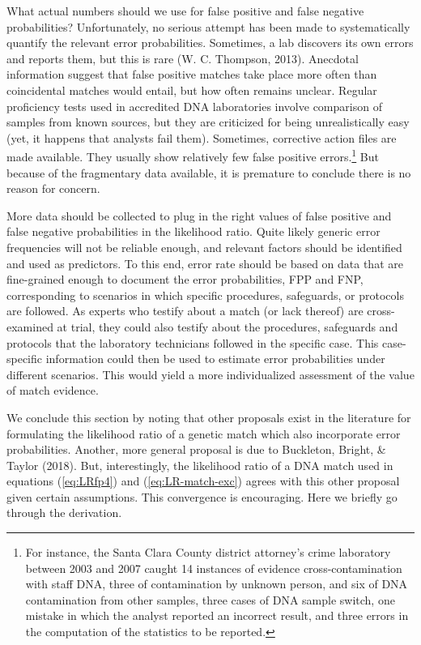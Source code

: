 \documentclass[
  letterpaper,
  DIV=11,
  numbers=noendperiod]{scrartcl}
\begin{document}
What actual numbers should we use for false positive and false negative
probabilities? Unfortunately, no serious attempt has been made to
systematically quantify the relevant error probabilities. Sometimes, a
lab discovers its own errors and reports them, but this is rare (W. C.
Thompson, 2013). Anecdotal information suggest that false positive
matches take place more often than coincidental matches would entail,
but how often remains unclear. Regular proficiency tests used in
accredited DNA laboratories involve comparison of samples from known
sources, but they are criticized for being unrealistically easy (yet, it
happens that analysts fail them). Sometimes, corrective action files are
made available. They usually show relatively few false positive
errors.\footnote{For instance, the Santa Clara County district
  attorney's crime laboratory between 2003 and 2007 caught 14 instances
  of evidence cross-contamination with staff DNA, three of contamination
  by unknown person, and six of DNA contamination from other samples,
  three cases of DNA sample switch, one mistake in which the analyst
  reported an incorrect result, and three errors in the computation of
  the statistics to be reported.} But because of the fragmentary data
available, it is premature to conclude there is no reason for concern.

More data should be collected to plug in the right values of false
positive and false negative probabilities in the likelihood ratio. Quite
likely generic error frequencies will not be reliable enough, and
relevant factors should be identified and used as predictors. To this
end, error rate should be based on data that are fine-grained enough to
document the error probabilities, FPP and FNP, corresponding to
scenarios in which specific procedures, safeguards, or protocols are
followed. As experts who testify about a match (or lack thereof) are
cross-examined at trial, they could also testify about the procedures,
safeguards and protocols that the laboratory technicians followed in the
specific case. This case-specific information could then be used to
estimate error probabilities under different scenarios. This would yield
a more individualized assessment of the value of match evidence.

We conclude this section by noting that other proposals exist in the
literature for formulating the likelihood ratio of a genetic match which
also incorporate error probabilities. Another, more general proposal is
due to Buckleton, Bright, \& Taylor (2018). But, interestingly, the
likelihood ratio of a DNA match used in equations (\ref{eq:LRfp4}) and
(\ref{eq:LR-match-exc}) agrees with this other proposal given certain
assumptions. This convergence is encouraging. Here we briefly go through
the derivation.
\end{document}

